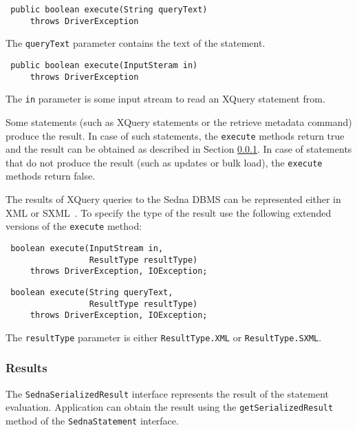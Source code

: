 \documentclass[a4paper,12pt]{article}
\begin{document}
\begin{verbatim}
 public boolean execute(String queryText)
     throws DriverException
\end{verbatim}

The \verb!queryText! parameter contains the text of the statement.

\begin{verbatim}
 public boolean execute(InputSteram in)
     throws DriverException
\end{verbatim}

The \verb!in! parameter is some input stream to read an XQuery statement from.

Some statements (such as XQuery statements or the retrieve metadata command)
produce the result. In case of such statements, the \verb!execute! methods
return true and the result can be obtained as described in Section
\ref{sec:results}. In case of statements that do not produce the result (such as
updates or bulk load), the \verb!execute! methods return false.

The results of XQuery queries to the Sedna DBMS can be represented either in XML
or SXML~\cite{paper:sxml}. To specify the type of the result use the following
extended versions of the \verb!execute! method:

\begin{verbatim}
 boolean execute(InputStream in,
                 ResultType resultType)
     throws DriverException, IOException;
\end{verbatim}

\begin{verbatim}
 boolean execute(String queryText,
                 ResultType resultType)
     throws DriverException, IOException;
\end{verbatim}

The \verb!resultType! parameter is either \verb!ResultType.XML! or
\verb!ResultType.SXML!.


\subsubsection{Results}
\label{sec:results}

The \verb!SednaSerializedResult! interface represents the result of the
statement evaluation. Application can obtain the result using the
\verb!getSerializedResult! method of the \verb!SednaStatement! interface.
\end{document}
